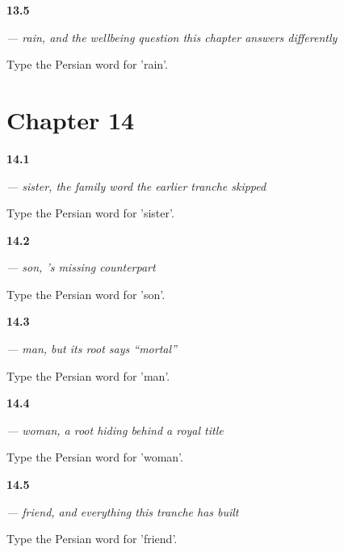 \noindent\begin{minipage}[t]{\linewidth}
\raggedright
\hypertarget{review-FA-C13-baran-meaning}{\textbf{13.5}} \emph{ — rain, and the wellbeing question this chapter answers differently}\par
\small Type the Persian word for 'rain'.
\end{minipage}\par\medskip

\section*{Chapter 14}

\noindent\begin{minipage}[t]{\linewidth}
\raggedright
\hypertarget{review-FA-C14-khahar-meaning}{\textbf{14.1}} \emph{ — sister, the family word the earlier tranche skipped}\par
\small Type the Persian word for 'sister'.
\end{minipage}\par\medskip

\noindent\begin{minipage}[t]{\linewidth}
\raggedright
\hypertarget{review-FA-C14-pesar-meaning}{\textbf{14.2}} \emph{ — son, 's missing counterpart}\par
\small Type the Persian word for 'son'.
\end{minipage}\par\medskip

\noindent\begin{minipage}[t]{\linewidth}
\raggedright
\hypertarget{review-FA-C14-mard-meaning}{\textbf{14.3}} \emph{ — man, but its root says \textquotedblleft{}mortal\textquotedblright{}}\par
\small Type the Persian word for 'man'.
\end{minipage}\par\medskip

\noindent\begin{minipage}[t]{\linewidth}
\raggedright
\hypertarget{review-FA-C14-zan-meaning}{\textbf{14.4}} \emph{ — woman, a root hiding behind a royal title}\par
\small Type the Persian word for 'woman'.
\end{minipage}\par\medskip

\noindent\begin{minipage}[t]{\linewidth}
\raggedright
\hypertarget{review-FA-C14-dust-meaning}{\textbf{14.5}} \emph{ — friend, and everything this tranche has built}\par
\small Type the Persian word for 'friend'.
\end{minipage}\par\medskip


